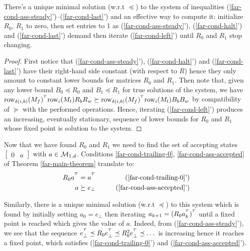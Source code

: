 \begin{lemma}\normalfont\label{lem:far-unique-min}
  There's a unique minimal solution (w.r.t $\preceq$) to the system  of inequalities (\ref{far-cond-ass-steady}')--(\ref{far-cond-last}') and an effective way to compute it: initialize $R_0$, $R_1$ to zero,
  then set entries to 1 as (\ref{far-cond-ass-steady}'), (\ref{far-cond-halt}') and (\ref{far-cond-last}') demand then iterate (\ref{far-cond-left}') until $R_0$ and $R_1$ stop changing.
\end{lemma}
\begin{proof}

  First notice that (\ref{far-cond-ass-steady}'), (\ref{far-cond-halt}') and (\ref{far-cond-last}') have their right-hand side constant (with respect to $R$) hence they only amount to constant lower bounds for matrices $R_0$ and $R_1$. Then note that, given any lower bound $B_0\preceq R_0$ and $B_1\preceq R_1$ for true solutions of the system, we have  $\text{row}_{\delta(i,b)}(M_f)^{^T} \text{row}_i(M_t)R_b R_w \succeq \text{row}_{\delta(i,b)}(M_f)^{^T} \text{row}_i(M_t)B_b B_w$ by compatibility of $\succeq$ with the performed operations. Hence, iterating (\ref{far-cond-left}') produces an increasing, eventually stationary, sequence of lower bounds for $R_0$ and $R_1$ whose fixed point is solution to the system.
\end{proof}


Now that we have found $R_0$ and $R_1$ we need to find the set of accepting states $\begin{bmatrix}0&a\end{bmatrix}$ with $a \in \mathcal{M}_{1,d}$.
Conditions \eqref{far-cond-trailing-0}, \eqref{far-cond-ass-accepted} of Theorem \ref{far-main-theorem}   translate to:
\begin{align}
  R_0 a^{\T} & = a^{\T}
             &
  \tag{\ref{far-cond-trailing-0}'}
  \\
  a          & \succeq e_{\bot}
             &
  \tag{\ref{far-cond-ass-accepted}'}
\end{align}

Similarly, there is a unique minimal solution (w.r.t $\preceq$) to this system which is found by initially setting $a_0 = e_\bot$ then iterating $a_{k+1} = (R_0 a_{k}^{^T})^{^T}$ until a fixed point is reached which gives the value of $a$. Indeed, from (\ref{far-cond-ass-steady}'), we see that the sequence $e_\bot^{^T} \preceq  R_0 e_\bot^{^T}\preceq R_0^2 e_\bot^{^T}  \preceq\dots$ is increasing hence it reaches a fixed point, which satisfies (\ref{far-cond-trailing-0}') and (\ref{far-cond-ass-accepted}').

